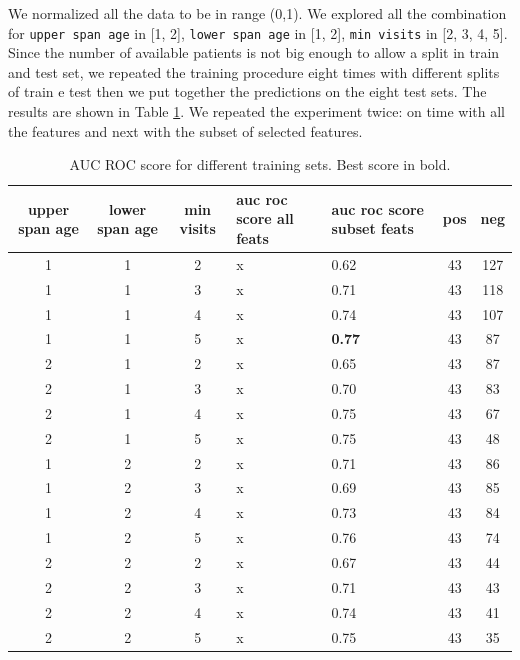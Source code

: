 We normalized all the data to be in range (0,1).
We explored all the combination for \texttt{upper span age} in [1, 2], \texttt{lower span age} in [1, 2], \texttt{min visits} in [2, 3, 4, 5]. Since the number of available patients is not big enough to allow a split in train and test set, we repeated the training procedure eight times with different splits of train e test then we put together the predictions on the eight test sets.  The results are shown in Table \ref{table:exp_res}. We repeated the experiment twice: on time with all the features and next with the subset of selected features.

\begin{table}[!h]
	\centering
	\begin{tabular}{c  c  c | m{2cm}  m{2cm} |  c  c}
		upper span age & lower span age & min visits & auc roc score all feats & auc roc score subset feats& pos & neg\\
		\hline
		1 & 1 & 2  & x & 0.62 & 43 & 127\\
		1 & 1 & 3  & x & 0.71 & 43 & 118\\
		1 & 1 & 4  & x & 0.74 & 43 & 107\\
		1 & 1 & 5  & x & \textbf{0.77} & 43 & 87\\
		2 & 1 & 2  & x & 0.65 & 43 & 87\\
		2 & 1 & 3  & x & 0.70 & 43 & 83\\
		2 & 1 & 4  & x & 0.75 & 43 & 67\\
		2 & 1 & 5  & x & 0.75 & 43 & 48\\
		1 & 2 & 2  & x & 0.71 & 43 & 86\\
		1 & 2 & 3  & x & 0.69 & 43 & 85\\
		1 & 2 & 4  & x & 0.73 & 43 & 84\\
		1 & 2 & 5  & x & 0.76 & 43 & 74\\
		2 & 2 & 2  & x & 0.67 & 43 & 44\\
		2 & 2 & 3  & x & 0.71 & 43 & 43\\
		2 & 2 & 4  & x & 0.74 & 43 & 41\\
		2 & 2 & 5  & x & 0.75 & 43 & 35\\
		
	\end{tabular}
	\caption{AUC ROC score for different training sets. Best score in bold.}
	\label{table:exp_res}
\end{table}


